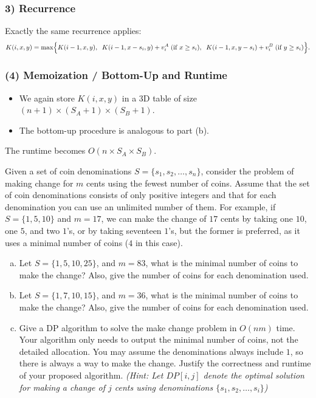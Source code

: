 \documentclass[11pt]{article}
\begin{document}
    \subsubsection*{3) Recurrence}
    
    Exactly the same recurrence applies:
    \[
    K(i,x,y) 
    = 
    \max\Bigl\{
        K(i-1, x, y),\;\;
        K(i-1, x - s_i, y) + v_i^A \;\text{(if } x \ge s_i),\;\;
        K(i-1, x, y - s_i) + v_i^B \;\text{(if } y \ge s_i)
    \Bigr\}.
    \]
    
    \subsubsection*{(4) Memoization / Bottom-Up and Runtime}
    
    \begin{itemize}
        \item We again store \(K(i,x,y)\) in a 3D table of size \((n+1) \times (S_A+1) \times (S_B+1)\).
        \item The bottom-up procedure is analogous to part (b).
    \end{itemize}
    The runtime becomes \(O(n \times S_A \times S_B)\).
    

    \newpage

    \begin{tcolorbox}[title={Problem 2 (Make Change, 50 points)}] \setlength\parindent{1em}
        
     Given a set of coin denominations $S=\{s_1, s_2,\dots, s_n\}$, consider the problem of making change for $m$ cents using the fewest
        number of coins. Assume that the set of coin denominations consists of only positive integers and that for each denomination you can use an unlimited number of them. For example, if $S=\{1, 5, 10\}$ and $m=17$, we can make the change of $17$ cents by taking one $10$, one $5$, and two $1$'s, or by taking seventeen $1$'s, but the former is preferred, as it uses a minimal number of coins ($4$ in this case).

    \begin{enumerate}[(a)]
    \item Let $S=\{1, 5, 10, 25\}$, and $m=83$, what is the minimal number of coins to make the change? Also, give the number of coins for each denomination used.
    \item Let $S=\{1, 7, 10, 15\}$, and $m=36$, what is the minimal number of coins to make the change? Also, give the number of coins for each denomination used.
    \item Give a DP algorithm to solve the make change problem in $O(nm)$ time. Your algorithm only needs to output the minimal number of coins, not the detailed allocation. You may assume the denominations always include $1$, so there is always a way to make the change. Justify the correctness and runtime of your proposed algorithm. \textit{(Hint: Let $DP[i,j]$ denote the optimal solution for making a change of $j$ cents using denominations $\{s_1, s_2, \dots, s_i\}$)}
    \end{enumerate}
    \end{tcolorbox}
    
    
    \newpage

    
    
\end{document}
